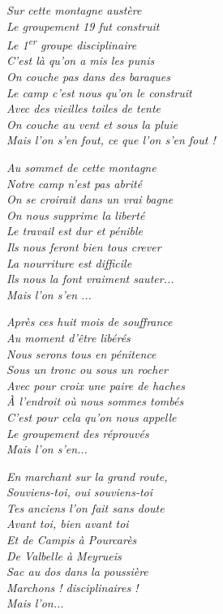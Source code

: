 
\begin{center}

\begin{minipage}{0.43\textwidth}
\itshape
Sur cette montagne austère\\
Le groupement 19 fut construit\\
Le 1\textsuperscript{er} groupe disciplinaire\\
C’est là qu’on a mis les punis\\
On couche pas dans des baraques\\
Le camp c’est nous qu’on le construit\\
Avec des vieilles toiles de tente\\
On couche au vent et sous la pluie\\
Mais l’on s’en fout, ce que l’on s’en fout !
\end{minipage}
\hfill
\begin{minipage}{0.43\textwidth}
\itshape
Au sommet de cette montagne\\
Notre camp n’est pas abrité\\
On se croirait dans un vrai bagne\\
On nous supprime la liberté\\
Le travail est dur et pénible\\
Ils nous feront bien tous crever\\
La nourriture est difficile\\
Ils nous la font vraiment sauter...\\
Mais l’on s’en ...
\end{minipage}

\vspace{1em}

\begin{minipage}{0.43\textwidth}
\itshape
Après ces huit mois de souffrance\\
Au moment d’être libérés\\
Nous serons tous en pénitence\\
Sous un tronc ou sous un rocher\\
Avec pour croix une paire de haches\\
À l’endroit où nous sommes tombés\\
C’est pour cela qu’on nous appelle\\
Le groupement des réprouvés\\
Mais l’on s’en...
\end{minipage}
\hfill
\begin{minipage}{0.43\textwidth}
\itshape
En marchant sur la grand route,\\
Souviens-toi, oui souviens-toi\\
Tes anciens l’on fait sans doute\\
Avant toi, bien avant toi\\
Et de Campis à Pourcarès\\
De Valbelle à Meyrueis\\
Sac au dos dans la poussière\\
Marchons ! disciplinaires !\\
Mais l’on...
\end{minipage}


\end{center}
